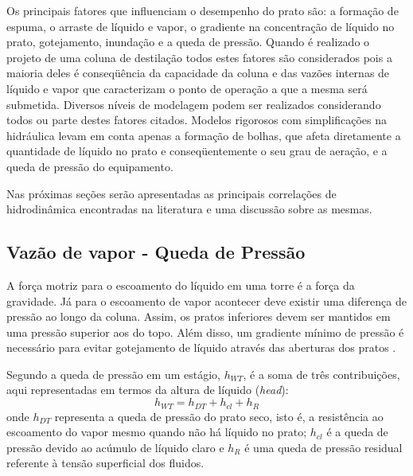 Os principais fatores que influenciam o desempenho do prato são: a formação de espuma, o arraste de líquido e vapor,
o gradiente na concentração de líquido no prato, gotejamento, inundação e a queda de pressão.
Quando é realizado o projeto de uma coluna de destilação todos estes fatores são considerados pois a maioria
deles é conseqüência da capacidade da coluna e das vazões internas de líquido e vapor que caracterizam o ponto
de operação a que a mesma será submetida.
Diversos níveis de modelagem podem ser realizados considerando todos ou parte destes fatores citados.
Modelos rigorosos com simplificações na hidráulica levam em conta
apenas a formação de bolhas, que afeta diretamente a quantidade de líquido no prato e conseqüentemente
o seu grau de aeração, e a queda de pressão do equipamento.

Nas próximas seções serão apresentadas as principais correlações de hidrodinâmica encontradas na literatura e uma
discussão sobre as mesmas.

\subsection{Vazão de vapor - Queda de Pressão}\label{sec:vapflow}
A força motriz para o escoamento do líquido em uma torre é a força da gravidade. Já para o escoamento de vapor acontecer
deve existir uma diferença de pressão ao longo da coluna. Assim, os pratos inferiores devem ser mantidos em uma
pressão superior aos do topo. Além disso, um gradiente mínimo de pressão é
necessário para evitar gotejamento de líquido através das aberturas dos pratos \cite{Khoury:2005}.

Segundo  a queda de pressão em um estágio, $h_{WT}$, é a soma de três contribuições,
aqui representadas em termos da altura de líquido (\textit{head}):
\begin{equation}
h_{WT} = h_{DT}+h_{cl}+h_R
\end{equation}
onde $h_{DT}$ representa a queda de pressão do prato seco, isto é, a resistência ao escoamento do vapor mesmo quando
não há líquido no prato; $h_{cl}$ é a queda de pressão devido ao acúmulo de líquido claro e $h_R$ é uma queda de pressão
residual referente à tensão superficial dos fluidos.

